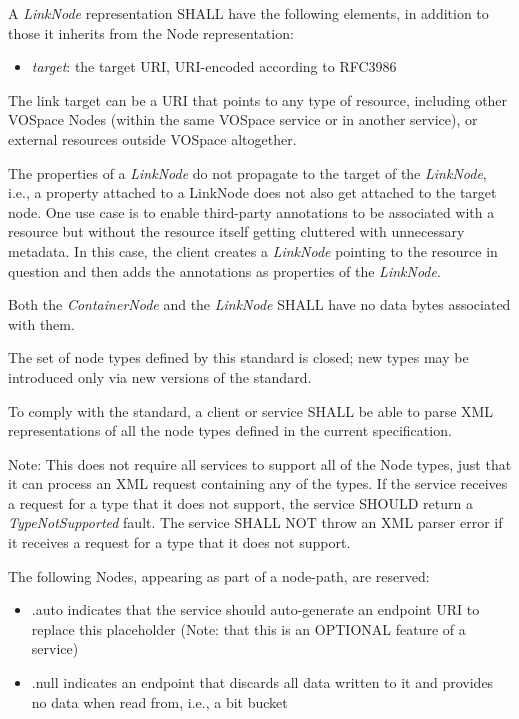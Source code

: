 \documentclass[11pt,a4paper]{ivoa}
\begin{document}
A \emph{LinkNode} representation SHALL have the following elements, in addition to those it inherits from the Node representation:

\begin{itemize}
    \item \emph{target}: the target URI, URI-encoded according to RFC3986 \citep{std:RFC3986}
\end{itemize}

The link target can be a URI that points to any type of resource, including other VOSpace Nodes (within the same VOSpace service or in another service), or external resources outside VOSpace altogether.

The properties of a \emph{LinkNode} do not propagate to the target of the \emph{LinkNode}, i.e., a property attached to a LinkNode does not also get attached to the target node. One use case is to enable third-party annotations to be associated with a resource but without the resource itself getting cluttered with unnecessary metadata. In this case, the client creates a \emph{LinkNode} pointing to the resource in question and then adds the annotations as properties of the \emph{LinkNode}.

Both the \emph{ContainerNode} and the \emph{LinkNode} SHALL have no data bytes associated with them.

The set of node types defined by this standard is closed; new types may be introduced only via new versions of the standard.

To comply with the standard, a client or service SHALL be able to parse XML representations of all the node types defined in the current specification.

Note: This does not require all services to support all of the Node types, just that it can process an XML request containing any of the types. If the service receives a request for a type that it does not support, the service SHOULD return a \emph{TypeNotSupported} fault. The service SHALL NOT throw an XML parser error if it receives a request for a type that it does not support.

The following Nodes, appearing as part of a node-path, are reserved:

\begin{itemize}
    \item .auto indicates that the service should auto-generate an endpoint URI to replace this placeholder (Note: that this is an OPTIONAL feature of a service)
    \item .null indicates an endpoint that discards all data written to it and provides no data when read from, i.e., a bit bucket
\end{itemize}
\end{document}
